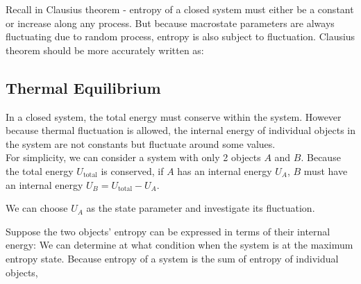 \documentclass[class=article, crop=false, 12pt]{standalone}
\begin{document}
\begin{notation}
    Recall in Clausius theorem - 
    entropy of a closed system must either be a constant 
    or increase along any process.
    But because macrostate parameters are always fluctuating due to random process,
    entropy is also subject to fluctuation. 
    Clausius theorem should be more accurately written as:

\end{notation}




\subsection{Thermal Equilibrium}

In a closed system, the total energy must conserve within the system.
However because thermal fluctuation is allowed,
the internal energy of individual objects in the system are not constants
but fluctuate around some values.\\ 

For simplicity, we can consider a system with only 2 objects $A$ and $B$.
Because the total energy $U_\text{total}$ is conserved, 
if $A$ has an internal energy $U_A$, $B$ must have an internal energy $U_B = U_\text{total}- U_A$.
\begin{center}
    We can choose $U_A$ as the state parameter and investigate its fluctuation.
\end{center}

Suppose the two objects' entropy can be expressed in terms of their internal energy: 
We can determine at what condition when the system is at the maximum entropy state.  
Because entropy of a system is the sum of entropy of individual objects,
\end{document}
